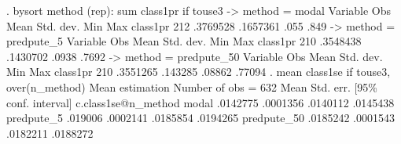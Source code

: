 . bysort method (rep): sum class1pr if touse3
{\smallskip}
-> method = modal
{\smallskip}
    Variable {\VBAR}        Obs        Mean    Std. dev.       Min        Max
    class1pr {\VBAR}        212    .3769528    .1657361       .055       .849
{\smallskip}
-> method = predpute_5
{\smallskip}
    Variable {\VBAR}        Obs        Mean    Std. dev.       Min        Max
    class1pr {\VBAR}        210    .3548438    .1430702      .0938      .7692
{\smallskip}
-> method = predpute_50
{\smallskip}
    Variable {\VBAR}        Obs        Mean    Std. dev.       Min        Max
    class1pr {\VBAR}        210    .3551265     .143285     .08862     .77094
{\smallskip}
{\smallskip}
. mean class1se if touse3, over(n_method)
{\smallskip}
Mean estimation                                   Number of obs = 632
{\smallskip}
                    {\VBAR}       Mean   Std. err.     [95\% conf. interval]
c.class1se@n_method {\VBAR}
             modal  {\VBAR}   .0142775   .0001356      .0140112    .0145438
        predpute_5  {\VBAR}    .019006   .0002141      .0185854    .0194265
       predpute_50  {\VBAR}   .0185242   .0001543      .0182211    .0188272
